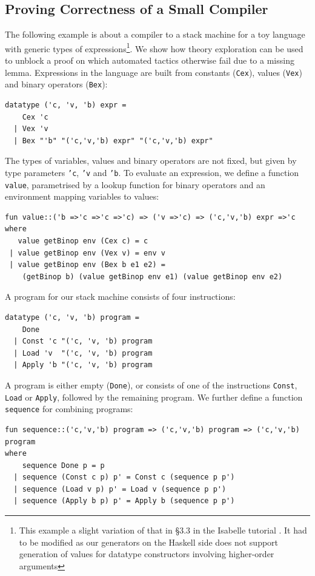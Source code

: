 \subsection{Proving Correctness of a Small Compiler}
The following example is about a compiler to a stack machine for a toy language with generic types of expressions\footnote{This example a slight variation of that in \S3.3 in the Isabelle tutorial \cite{isabelle}. It had to be modified as our generators on the Haskell side does not support generation of values for datatype constructors involving higher-order arguments}. We show how theory exploration can be used to unblock a proof on which automated tactics otherwise fail due to a missing lemma.
Expressions in the language are built from constants (\texttt{Cex}), values (\texttt{Vex}) and binary operators (\texttt{Bex}): 
\begin{verbatim}
datatype ('c, 'v, 'b) expr =
    Cex 'c 
  | Vex 'v 
  | Bex "'b" "('c,'v,'b) expr" "('c,'v,'b) expr"
\end{verbatim}
The types of variables, values and binary operators are not fixed, but given by type parameters \texttt{'c}, \texttt{'v} and \texttt{'b}. 
To evaluate an expression, we define a function \texttt{value}, parametrised by a lookup function for binary operators and an environment mapping variables to values:
\begin{verbatim}
fun value::('b =>'c =>'c =>'c) => ('v =>'c) => ('c,'v,'b) expr =>'c
where
   value getBinop env (Cex c) = c
 | value getBinop env (Vex v) = env v
 | value getBinop env (Bex b e1 e2) = 
    (getBinop b) (value getBinop env e1) (value getBinop env e2)
\end{verbatim}
A program for our stack machine consists of four instructions:
\begin{verbatim}
datatype ('c, 'v, 'b) program =
    Done
  | Const 'c "('c, 'v, 'b) program
  | Load 'v  "('c, 'v, 'b) program
  | Apply 'b "('c, 'v, 'b) program
\end{verbatim}
A program is either empty (\texttt{Done}), or consists of one of the instructions \texttt{Const}, \texttt{Load} or \texttt{Apply}, followed by the remaining program. We further define a function \texttt{sequence} for combining programs:
\begin{verbatim}
fun sequence::('c,'v,'b) program => ('c,'v,'b) program => ('c,'v,'b) program
where
    sequence Done p = p
  | sequence (Const c p) p' = Const c (sequence p p')
  | sequence (Load v p) p' = Load v (sequence p p')
  | sequence (Apply b p) p' = Apply b (sequence p p')
\end{verbatim}
